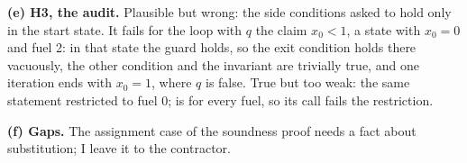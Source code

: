 \documentclass[11pt]{article}
\begin{document}
\begin{answer}
\textbf{(e) H3, the audit.} Plausible but wrong: the side conditions asked to hold
only in the start state. It fails for the loop  with $q$ the claim $x_0 < 1$, a
state with $x_0 = 0$ and fuel 2: in that state the guard holds, so the exit
condition holds there vacuously, the other condition and the invariant are
trivially true, and one iteration ends with $x_0 = 1$, where $q$ is false. True
but too weak: the same statement restricted to fuel 0;  is
for every fuel, so its call fails the restriction.

\textbf{(f) Gaps.} The assignment case of the soundness proof needs a fact about
substitution; I leave it to the contractor.
\end{answer}

\end{document}
